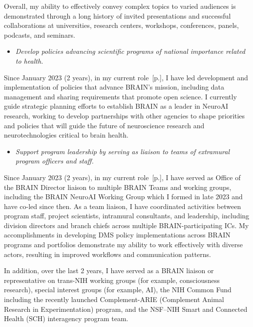 \documentclass[10pt]{article}
\newcommand{\see}[1]{[\textcolor{hopkinsblue}{p.\pageref{sec:#1}}]}
\begin{document}
Overall, my ability to effectively convey complex topics to varied audiences
is demonstrated through a long history of invited presentations and successful
collaborations at universities, research centers, workshops, conferences,
panels, podcasts, and seminars.

\begin{itemize}
  \color{hopkinsblue}
  \item \emph{Develop policies advancing scientific programs of national
importance related to health.}
\end{itemize}

Since January 2023 (2 years), in my current role~\see{jobobd}, I have led
development and implementation of policies that advance BRAIN's mission,
including data management and sharing requirements that promote open science.
I currently guide strategic planning efforts to establish BRAIN as a leader in
NeuroAI research, working to develop partnerships with other agencies to shape
priorities and policies that will guide the future of neuroscience research and
neurotechnologies critical to brain health.

\begin{itemize}
  \color{hopkinsblue}
  \item \emph{Support program leadership by serving as liaison to teams of
extramural program officers and staff.}
\end{itemize}

Since January 2023 (2 years), in my current role~\see{jobobd}, I have served
as Office of the BRAIN Director liaison to multiple BRAIN Teams and working
groups, including the BRAIN NeuroAI Working Group which I formed in late
2023 and have co-led since then. As a team liaison, I have coordinated
activities between program staff, project scientists, intramural consultants,
and leadership, including division directors and branch chiefs across
multiple BRAIN-participating ICs. My accomplishments in developing DMS policy
implementations across BRAIN programs and portfolios demonstrate my ability
to work effectively with diverse actors, resulting in improved workflows and
communication patterns. 

In addition, over the last 2 years, I have served as a BRAIN liaison or
representative on trans-NIH working groups (for example, consciousness
research), special interest groups (for example, AI), the NIH Common Fund
including the recently launched Complement-ARIE (Complement Animal Research in
Experimentation) program, and the NSF--NIH Smart and Connected Health (SCH)
interagency program team.
\end{document}
